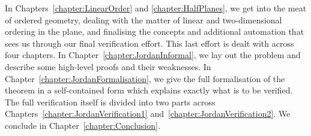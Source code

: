In Chapters~\ref{chapter:LinearOrder} and \ref{chapter:HalfPlanes}, we get into the meat of ordered geometry, dealing with the matter of linear and two-dimensional ordering in the plane, and finalising the concepts and additional automation that sees us through our final verification effort. This last effort is dealt with across four chapters. In Chapter~\ref{chapter:JordanInformal}, we lay out the problem and describe some high-level proofs and their weaknesses. In Chapter~\ref{chapter:JordanFormalisation}, we give the full formalisation of the theorem in a self-contained form which explains exactly what is to be verified. The full verification itself is divided into two parts across Chapters~\ref{chapter:JordanVerification1} and~\ref{chapter:JordanVerification2}. We conclude in Chapter~\ref{chapter:Conclusion}.

